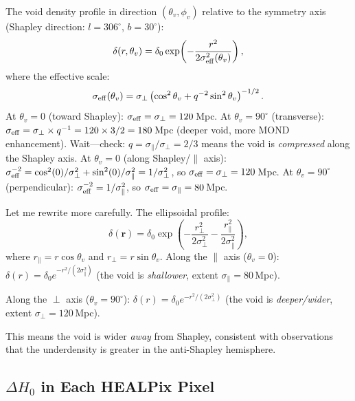 \documentclass[aps,prd,twocolumn,superscriptaddress]{revtex4-2}
\begin{document}
The void density profile in direction $(\theta_v, \phi_v)$ relative
to the symmetry axis (Shapley direction: $l = 306^\circ$,
$b = 30^\circ$):
\begin{equation}
\delta(r,\theta_v) = \delta_0\exp\!\left(-\frac{r^2}{2\sigma_{\rm eff}^2(\theta_v)}\right),
\label{eq:void-profile-direction}
\end{equation}
where the effective scale:
\begin{equation}
\sigma_{\rm eff}(\theta_v) = \sigma_\perp
\left(\cos^2\theta_v + q^{-2}\sin^2\theta_v\right)^{-1/2}.
\label{eq:sigma-eff}
\end{equation}
At $\theta_v = 0$ (toward Shapley): $\sigma_{\rm eff} = \sigma_\perp
= 120$\,Mpc.
At $\theta_v = 90^\circ$ (transverse): $\sigma_{\rm eff}
= \sigma_\perp\times q^{-1} = 120\times3/2 = 180$\,Mpc (deeper
void, more MOND enhancement).
Wait---check: $q = \sigma_\parallel/\sigma_\perp = 2/3$ means the
void is \emph{compressed} along the Shapley axis.  At $\theta_v = 0$
(along Shapley/$\parallel$ axis): $\sigma_{\rm eff}^{-2} =
\cos^2(0)/\sigma_\perp^2 + \sin^2(0)/\sigma_\parallel^2
= 1/\sigma_\perp^2$, so $\sigma_{\rm eff} = \sigma_\perp = 120$\,Mpc.
At $\theta_v = 90^\circ$ (perpendicular):
$\sigma_{\rm eff}^{-2} = 1/\sigma_\parallel^2$, so
$\sigma_{\rm eff} = \sigma_\parallel = 80$\,Mpc.

Let me rewrite more carefully. The ellipsoidal profile:
\begin{equation}
\delta(\mathbf{r}) = \delta_0\exp\!\left(
-\frac{r_\perp^2}{2\sigma_\perp^2}
-\frac{r_\parallel^2}{2\sigma_\parallel^2}
\right),
\end{equation}
where $r_\parallel = r\cos\theta_v$ and $r_\perp = r\sin\theta_v$.
Along the $\parallel$ axis ($\theta_v = 0$):
$\delta(r) = \delta_0 e^{-r^2/(2\sigma_\parallel^2)}$
(the void is \emph{shallower}, extent $\sigma_\parallel = 80$\,Mpc).

Along the $\perp$ axis ($\theta_v = 90^\circ$):
$\delta(r) = \delta_0 e^{-r^2/(2\sigma_\perp^2)}$
(the void is \emph{deeper/wider}, extent $\sigma_\perp = 120$\,Mpc).

This means the void is wider \emph{away} from Shapley, consistent
with observations that the underdensity is greater in the anti-Shapley
hemisphere.

\subsection{$\Delta H_0$ in Each HEALPix Pixel}
\end{document}
